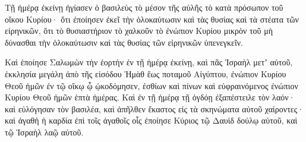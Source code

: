 {Τῇ ἡμέρᾳ ἐκείνῃ ἡγίασεν ὁ βασιλεὺς τὸ μέσον τῆς αὐλῆς τὸ κατὰ πρόσωπον τοῦ οἴκου Κυρίου· ὅτι ἐποίησεν ἐκεῖ τὴν ὁλοκαύτωσιν καὶ τὰς θυσίας καὶ τὰ στέατα τῶν εἰρηνικῶν, ὅτι τὸ θυσιαστήριον τὸ χαλκοῦν τὸ ἐνώπιον Κυρίου μικρὸν τοῦ μὴ δύνασθαι τὴν ὁλοκαύτωσιν καὶ τὰς θυσίας τῶν εἰρηνικῶν ὑπενεγκεῖν.
\par }{\PP {}Καὶ ἑποίησε Σαλωμὼν τὴν ἑορτὴν ἐν τῇ ἡμέρᾳ ἐκείνῃ, καὶ πᾶς Ἰσραὴλ μετʼ αὐτοῦ, ἐκκλησία μεγάλη ἀπὸ τῆς εἰσόδου Ἡμὰθ ἕως ποταμοῦ Αἰγύπτου, ἐνώπιον Κυρίου Θεοῦ ἡμῶν ἐν τῷ οἴκῳ ᾧ ᾠκοδόμησεν, ἐσθίων καὶ πίνων καὶ εὐφραινόμενος ἐνώπιον Κυρίου Θεοῦ ἡμῶν ἑπτὰ ἡμέρας.
Καὶ ἐν τῇ ἡμέρᾳ τῇ ὀγδόῃ ἐξαπέστειλε τὸν λαόν· καὶ εὐλόγησαν τὸν βασιλέα, καὶ ἀπῆλθεν ἕκαστος εἰς τὰ σκηνώματα αὐτοῦ χαίροντες· καὶ ἀγαθὴ ἡ καρδία ἐπὶ τοῖς ἀγαθοῖς οἷς ἐποίησε Κύριος τῷ Δαυὶδ δούλῳ αὐτοῦ, καὶ τῷ Ἰσραὴλ λαῷ αὐτοῦ.

}
